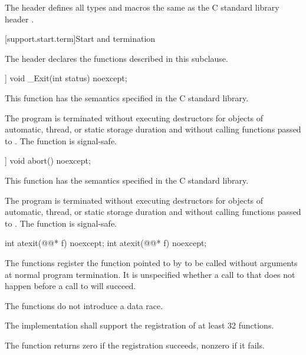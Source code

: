 \pnum
The header defines all types and macros the same as
the C standard library header .


[support.start.term]{Start and termination}

\pnum
\begin{note}
The header 
declares the functions described in this subclause.
\end{note}

%
\begin{itemdecl}
[[noreturn]] void _Exit(int status) noexcept;
\end{itemdecl}

\begin{itemdescr}
\pnum
\effects
This function has the semantics specified in the C standard library.

\pnum
\remarks
The program is terminated without executing destructors for objects of automatic,
thread, or static storage duration and without calling functions passed to
.
%
The function  is signal-safe.
\end{itemdescr}

%
\begin{itemdecl}
[[noreturn]] void abort() noexcept;
\end{itemdecl}

\begin{itemdescr}
\pnum
\effects
This function has the semantics specified in the C standard library.

\pnum
\remarks
The program is terminated without executing destructors for objects of
automatic, thread, or static storage
duration and without calling functions passed to
.
%
The function  is signal-safe.
\end{itemdescr}

%
\begin{itemdecl}
int atexit(@@* f) noexcept;
int atexit(@@* f) noexcept;
\end{itemdecl}

\begin{itemdescr}
\pnum
\effects
The
functions register the function pointed to by 
to be called without arguments at normal program termination.
It is unspecified whether a call to  that does not
happen before a call to  will succeed.
\begin{note}
The  functions do not introduce a data
race.
\end{note}

\pnum
\implimits
The implementation shall support the registration of at least 32 functions.

\pnum
\returns
The
function returns zero if the registration succeeds,
nonzero if it fails.
\end{itemdescr}

